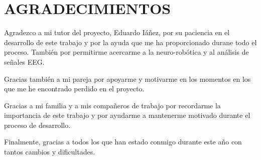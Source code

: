 \newpage
\thispagestyle{plain}

\section*{AGRADECIMIENTOS} %

Agradezco a mi tutor del proyecto, Eduardo Iáñez, por su paciencia en el desarrollo de este trabajo y por la ayuda que me ha proporcionado durane todo el proceso. También por permitirme acercarme a la neuro-robótica y al análisis de señales EEG.

Gracias también a mi pareja por apoyarme y motivarme en los momentos en los que me he encontrado perdido en el proyecto.

Gracias a mi familia y a mis compañeros de trabajo por recordarme la importancia de este trabajo y por ayudarme a mantenerme motivado durante el proceso de desarrollo.

Finalmente, gracias a todos los que han estado conmigo durante este año con tantos cambios y dificultades.

\afterpage{\blankpage} %